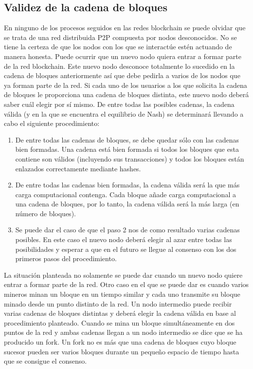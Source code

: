 \subsection{Validez de la cadena de bloques}
En ninguno de los procesos seguidos en las redes blockchain se puede olvidar que se trata de una red distribuida P2P compuesta por nodos desconocidos. No se tiene la certeza de que los nodos con los que se interactúe estén actuando de manera honesta. Puede ocurrir que un nuevo nodo quiera entrar a formar parte de la red blockchain. Este nuevo nodo desconoce totalmente lo sucedido en la cadena de bloques anteriormente así que debe pedirla a varios de los nodos que ya forman parte de la red. Si cada uno de los usuarios a los que solicita la cadena de bloques le proporciona una cadena de bloques distinta, este nuevo nodo deberá saber cuál elegir por sí mismo. 
De entre todas las posibles cadenas, la cadena válida (y en la que se encuentra el equilibrio de Nash) se determinará llevando a cabo el siguiente procedimiento:

\begin{enumerate}
	\item De entre todas las cadenas de bloques, se debe quedar sólo con las cadenas bien formadas. Una cadena está bien formada si todos los bloques que esta contiene son válidos (incluyendo sus transacciones) y todos los bloques están enlazados correctamente mediante hashes.
	\item De entre todas las cadenas bien formadas, la cadena válida será la que más carga computacional contenga. Cada bloque añade carga computacional a una cadena de bloques, por lo tanto, la cadena válida será la más larga (en número de bloques).
	\item Se puede dar el caso de que el paso 2 nos de como resultado varias cadenas posibles. En este caso el nuevo nodo deberá elegir al azar entre todas las posibilidades y esperar a que en el futuro se llegue al consenso con los dos primeros pasos del procedimiento.
\end{enumerate}

La situación planteada no solamente se puede dar cuando un nuevo nodo quiere entrar a formar parte de la red. Otro caso en el que se puede dar es cuando varios mineros minan un bloque en un tiempo similar y cada uno transmite su bloque minado desde un punto distinto de la red. Un nodo intermedio puede recibir varias cadenas de bloques distintas y deberá elegir la cadena válida en base al procedimiento planteado. Cuando se mina un bloque simultáneamente en dos puntos de la red y ambas cadenas llegan a un nodo intermedio se dice que se ha producido un fork. Un fork no es más que una cadena de bloques cuyo bloque sucesor pueden ser varios bloques durante un pequeño espacio de tiempo hasta que se consigue el consenso.

